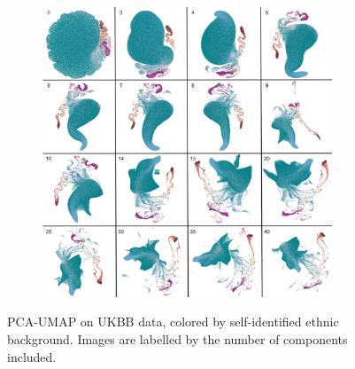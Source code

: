 \documentclass[12pt]{pnas-new}
\begin{document}
\begin{figure}
    \centering
    \begin{subfigure}{0.95\textwidth}
    \includegraphics[width=0.95\textwidth]{images/megamontage_eth_ukbb.pdf}
    \end{subfigure}
    \caption{PCA-UMAP on UKBB data, colored by self-identified ethnic background. Images are labelled by the number of components included.}
    \label{fig:supp_montage_ukbb_eth}
\end{figure}
\end{document}
